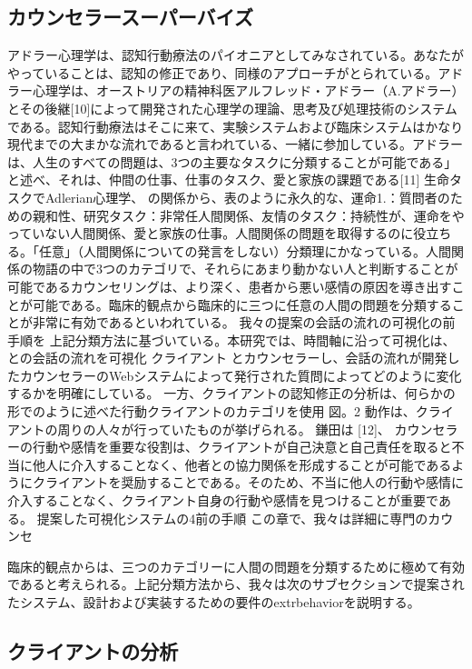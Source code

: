 \documentclass[shuuron]{kuee}
\begin{document}
\subsection{カウンセラースーパーバイズ}

アドラー心理学は、認知行動療法のパイオニアとしてみなされている。あなたがやっていることは、認知の修正であり、同様のアプローチがとられている。アドラー心理学は、オーストリアの精神科医アルフレッド・アドラー（A.アドラー）とその後継[10]によって開発された心理学の理論、思考及び処理技術のシステムである。認知行動療法はそこに来て、実験システムおよび臨床システムはかなり現代までの大まかな流れであると言われている、一緒に参加している。アドラーは、人生のすべての問題は、3つの主要なタスクに分類することが可能である」と述べ、それは、仲間の仕事、仕事のタスク、愛と家族の課題である[11] 生命タスクでAdlerian心理学、 の関係から、表のように永久的な、運命1.：質問者のための親和性、研究タスク：非常任人間関係、友情のタスク：持続性が、運命をやっていない人間関係、愛と家族の仕事。人間関係の問題を取得するのに役立ちる。「任意」（人間関係についての発言をしない）分類理にかなっている。人間関係の物語の中で3つのカテゴリで、それらにあまり動かない人と判断することが可能であるカウンセリングは、より深く、患者から悪い感情の原因を導き出すことが可能である。臨床的観点から臨床的に三つに任意の人間の問題を分類することが非常に有効であるといわれている。
我々の提案の会話の流れの可視化の前手順を 上記分類方法に基づいている。本研究では、時間軸に沿って可視化は、との会話の流れを可視化 クライアント とカウンセラーし、会話の流れが開発したカウンセラーのWebシステムによって発行された質問によってどのように変化するかを明確にしている。
一方、クライアントの認知修正の分析は、何らかの形でのように述べた行動クライアントのカテゴリを使用 図。2 動作は、クライアントの周りの人々が行っていたものが挙げられる。 鎌田は [12]、 カウンセラーの行動や感情を重要な役割は、クライアントが自己決意と自己責任を取ると不当に他人に介入することなく、他者との協力関係を形成することが可能であるようにクライアントを奨励することである。そのため、不当に他人の行動や感情に介入することなく、クライアント自身の行動や感情を見つけることが重要である。
提案した可視化システムの4前の手順
 この章で、我々は詳細に専門のカウンセ

 臨床的観点からは、三つのカテゴリーに人間の問題を分類するために極めて有効であると考えられる。上記分類方法から、我々は次のサブセクションで提案されたシステム、設計および実装するための要件のextrbehaviorを説明する。
\subsection{クライアントの分析}
\end{document}
